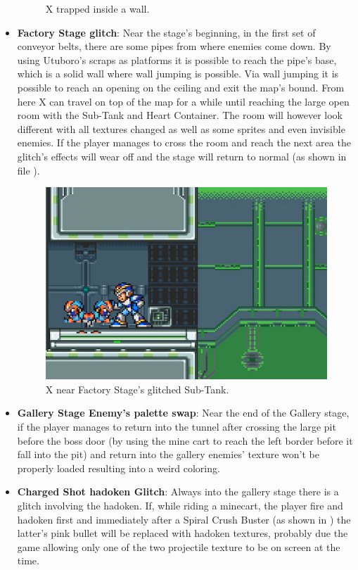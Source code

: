 \begin{itemize}
\begin{figure}[htp]
		\caption{X trapped inside a wall.}
	\end{figure}
	\item \textbf{Factory Stage glitch}: Near the stage's beginning,  in the first set of conveyor belts, there are some pipes from where enemies come down. By using Utuboro's scraps as platforms it is possible to reach the pipe's base, which is a solid wall where wall jumping is possible. Via wall jumping it is possible to reach an opening on the ceiling and exit the map's bound. From here X can travel on top of the map for a while until reaching the large open room with the Sub-Tank and Heart Container. The room will however look different with all textures changed as well as some sprites and even invisible enemies. If the player manages to cross the room and reach the next area the glitch's effects will wear off and the stage will return to normal (as shown in file ).
	\begin{figure}[htp]
		\centering
		\includegraphics[width=0.5\linewidth]{figures/X1/Miscs/Factory_glitch_heart.jpg}
		\caption{X near Factory Stage's glitched Sub-Tank.}
	\end{figure}
	\item \textbf{Gallery Stage Enemy's palette swap}: Near the end of the Gallery stage, if the player manages to return into the tunnel after crossing the large pit before the boss door (by using the mine cart to reach the left border before it fall into the pit) and return into the gallery enemies' texture won't be properly loaded resulting into a weird coloring.
	\item \textbf{Charged Shot hadoken Glitch}: Always into the gallery stage there is a glitch involving the hadoken. If, while riding a minecart, the player fire and hadoken first and immediately after a Spiral Crush Buster (as shown in ) the latter's pink bullet will be replaced with hadoken textures, probably due the game allowing only one of the two projectile texture to be on screen at the time.
	\begin{figure}[htp]

\end{figure}
\end{itemize}
